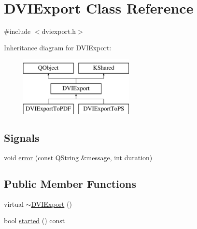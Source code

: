 \hypertarget{classDVIExport}{\section{D\+V\+I\+Export Class Reference}
\label{classDVIExport}
}


{\ttfamily \#include $<$dviexport.\+h$>$}

Inheritance diagram for D\+V\+I\+Export\+:\begin{figure}[H]
\begin{center}
\leavevmode
\includegraphics[height=3.000000cm]{classDVIExport}
\end{center}
\end{figure}
\subsection*{Signals}
\begin{DoxyCompactItemize}
\item 
void \hyperlink{classDVIExport_af4dc2cb358975a05b15c145fbe8d4e8f}{error} (const Q\+String \&message, int duration)
\end{DoxyCompactItemize}
\subsection*{Public Member Functions}
\begin{DoxyCompactItemize}
\item 
virtual \hyperlink{classDVIExport_ae71fe89f41c6842f1cdfdc7e3524c991}{$\sim$\+D\+V\+I\+Export} ()
\item 
bool \hyperlink{classDVIExport_a76c99695abb93d11922137496f2ff332}{started} () const 
\end{DoxyCompactItemize}
